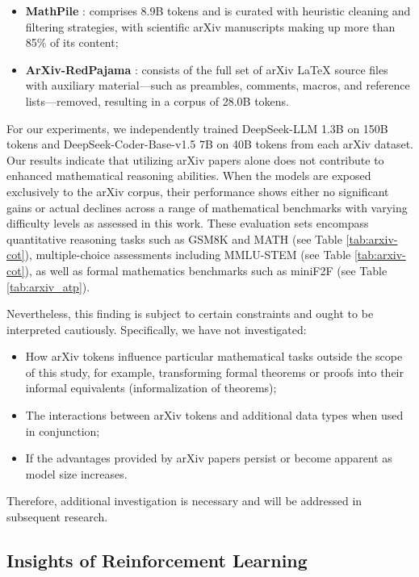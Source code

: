 \begin{itemize}[topsep=0pt]
\begin{itemize}[topsep=0pt]
    \item \textbf{MathPile} \citep{mathpile}: comprises 8.9B tokens and is curated with heuristic cleaning and filtering strategies, with scientific arXiv manuscripts making up more than 85\% of its content;
    \item \textbf{ArXiv-RedPajama} \citep{redpajama}: consists of the full set of arXiv LaTeX source files with auxiliary material—such as preambles, comments, macros, and reference lists—removed, resulting in a corpus of 28.0B tokens.
\end{itemize}

For our experiments, we independently trained DeepSeek-LLM 1.3B on 150B tokens and DeepSeek-Coder-Base-v1.5 7B on 40B tokens from each arXiv dataset. Our results indicate that utilizing arXiv papers alone does not contribute to enhanced mathematical reasoning abilities. When the models are exposed exclusively to the arXiv corpus, their performance shows either no significant gains or actual declines across a range of mathematical benchmarks with varying difficulty levels as assessed in this work. These evaluation sets encompass quantitative reasoning tasks such as GSM8K and MATH (see Table \ref{tab:arxiv-cot}), multiple-choice assessments including MMLU-STEM (see Table \ref{tab:arxiv-cot}), as well as formal mathematics benchmarks such as miniF2F (see Table \ref{tab:arxiv_atp}).

Nevertheless, this finding is subject to certain constraints and ought to be interpreted cautiously. Specifically, we have not investigated:

\begin{itemize}[topsep=0pt]
    \item How arXiv tokens influence particular mathematical tasks outside the scope of this study, for example, transforming formal theorems or proofs into their informal equivalents (informalization of theorems);
    \item The interactions between arXiv tokens and additional data types when used in conjunction;
    \item If the advantages provided by arXiv papers persist or become apparent as model size increases.
\end{itemize}

Therefore, additional investigation is necessary and will be addressed in subsequent research.

\subsection{Insights of Reinforcement Learning}

\end{itemize}
